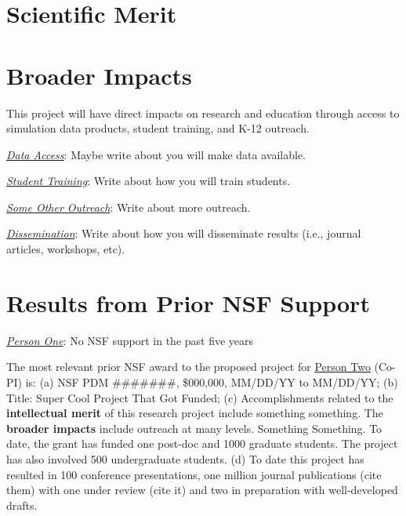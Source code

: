 \section{Scientific Merit}



\section{Broader Impacts}
\label{broadimpacts}
\vspace*{-8pt}

This project will have direct impacts on research and education through access to simulation data products, student training, and K-12 outreach.

\vspace{4pt}
\noindent \underline{\textit{Data Access}}: Maybe write about you will make data available.

\vspace{4pt}
\noindent \underline{\textit{Student Training}}: Write about how you will train students.

\vspace{4pt}
\noindent \underline{\textit{Some Other Outreach}}: Write about more outreach.

\vspace{4pt}
\noindent \underline{\textit{Dissemination}}: Write about how you will disseminate results (i.e., journal articles, workshops, etc).

\section{Results from Prior NSF Support}

\noindent \emph{\underline{Person One}}: No NSF support in the past five years \newline

\noindent The most relevant prior NSF award to the proposed project for
\underline{Person Two} (Co-PI) is: (a) NSF PDM \#\#\#\#\#\#\#, \$000,000,
MM/DD/YY to MM/DD/YY; (b) Title: Super Cool Project That Got Funded; (c)
Accomplishments related to the \textbf{intellectual merit} of this research project
include something something. The \textbf{broader impacts} include outreach at many
levels. Something Something. To date, the grant has funded one post-doc and 1000
graduate students. The project has also involved 500 undergraduate students. (d)
To date this project has resulted in 100 conference presentations, one million
journal publications (cite them) with one under review (cite it) and two in
preparation with well-developed drafts.

